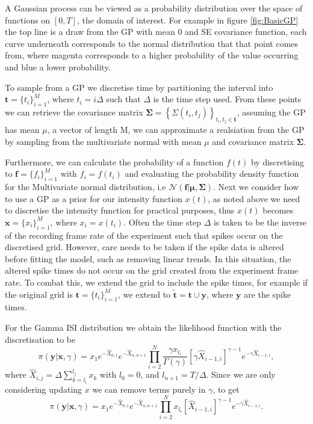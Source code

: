 \documentclass[../main.tex]{subfiles}
\begin{document}
    
    A Gaussian process can be viewed as a probability distribution over the space of functions on $[0,T]$, the domain of interest. For example in figure \ref{fig:BasicGP} the top line is a draw from the GP with mean 0 and SE covariance function, each curve underneath corresponds to the normal distribution that that point comes from, where magenta corresponds to a higher probability of the value occurring and blue a lower probability.  
     
     To sample from a GP we discretise time by partitioning the interval into $\mathbf{t} = \{t_i \}^M_{i=1} $, where $t_i = i \Delta$ such that $\Delta$ is the time step used. From these points we can retrieve the covariance matrix $\mathbf{\Sigma} = \left\{ \Sigma (t_i, t_j ) \right\}_{t_i , t_j  \in \mathbf{t}}$, assuming the GP has mean $\mu$, a vector of length M,  we can approximate a realsiation from the GP by sampling from the multivariate normal with mean $\mu$ and covariance matrix $\mathbf{\Sigma}$. 
     
     Furthermore, we can calculate the probability of a function $f(t)$ by discretising to $\mathbf{f} = \{f_i \}^M_{i=1}$ with $f_i = f(t_i)$ and evaluating the probability density function for the Multivariate normal distribution, i.e $ \mathcal{N}(\mathbf{f} | \mathbf{ \mu}, \mathbf{\Sigma})$. 
    Next we consider how to use a GP as a prior for our intensity function $x(t)$, as noted above we need to discretise the intensity function for practical purposes, thus $x(t)$ becomes $\mathbf{x} = \{ x_i\}^M_{i=1}  $, where $x_i = x(t_i)$. Often the time step $\Delta$ is taken to be the inverse of the recording frame rate of the experiment such that spikes occur on the discretised grid.  However, care needs to be taken if the spike data is altered before fitting the model, such as removing linear trends. In this situation, the altered spike times do not occur on  the grid created from the experiment frame rate. To combat this, we extend the grid to include the spike times, for example if the original grid is $\mathbf{t} = \{t_i \}^M_{i=1} $, we extend to $\mathbf{\tilde t} = \mathbf{t} \cup \mathbf{y}$, where $\mathbf{y}$ are the spike times.
    
    For the Gamma ISI distribution we obtain the likelihood function with the discretisation to be
\begin{equation}
\pi (\mathbf{y} | \mathbf{x}, \gamma) = x_{1} e^{-\hat X_{0,1}} e^{-\hat X_{n, n+1}} \prod^{N}_{i=2} \frac{ \gamma x_{l_i}}{\Gamma (\gamma )} \left[ \gamma \hat X_{i-1,i} \right] ^{\gamma -1} e^{-\gamma \hat X_{i-1,i}},
\end{equation}   
where $\hat X_{i,j} = \Delta \sum^{l_j}_{k = l_i} x_k$ with $l_0 = 0$, and $l_{n+1} = T/ \Delta$. Since we are only considering updating $x$ we can remove terms purely in $\gamma$, to get 
\begin{equation}\label{eq:xlikeli}
\pi (\mathbf{y} | \mathbf{x},\gamma) = x_{1} e^{-\hat X_{0,1}} e^{-\hat X_{n, n+1}} \prod^{N}_{i=2} x_{l_i} \left[\hat X_{i-1,i} \right] ^{\gamma -1} e^{-\gamma \hat X_{i-1,i}} .
\end{equation}    
\end{document}
